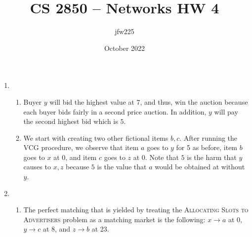 \documentclass{article}
\title{CS 2850 -- Networks HW 4}
\author{jfw225 }
\date{October 2022}
\begin{document}
\maketitle

\begin{enumerate}
    \item \begin{enumerate}
        \item Buyer $y$ will bid the highest value at 7, and thus, win the auction because each buyer bids fairly in a second price auction. In addition, $y$ will pay the second highest bid which is $5$.
        
        \item We start with creating two other fictional items $b,c$. After running the VCG procedure, we observe that item $a$ goes to $y$ for 5 as before, item $b$ goes to $x$ at 0, and item $c$ goes to $z$ at 0. Note that $5$ is the harm that $y$ causes to $x,z$ because $5$ is the value that $a$ would be obtained at without $y$.
    \end{enumerate}

    \item \begin{enumerate}
        \item The perfect matching that is yielded by treating the \textsc{Allocating Slots to Advertisers} problem as a matching market is the following: $x\to a$ at 0, $y\to c$ at 8, and $z\to b$ at 23.
    \end{enumerate}
\end{enumerate}
\end{document}
